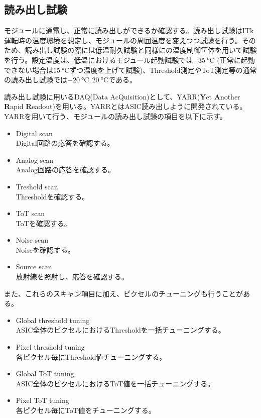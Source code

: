 \subsection{読み出し試験 \cite{electricaldoc}}
\label{sec:electricaltest}
モジュールに通電し、正常に読み出しができるか確認する。読み出し試験はITk運転時の温度環境を想定し、モジュールの周囲温度を変えつつ試験を行う。そのため、読み出し試験の際には低温耐久試験と同様にの温度制御筐体を用いて試験を行う。設定温度は、低温におけるモジュール起動試験では$-35\ \si{\degreeCelsius}$ (正常に起動できない場合は$15\ \si{\degreeCelsius}$ずつ温度を上げて試験)、Threshold測定やToT測定等の通常の読み出し試験では$-20\ \si{\degreeCelsius}, 20\ \si{\degreeCelsius}$である。

読み出し試験に用いるDAQ(Data AcQuisition)として、YARR(\textbf{Y}et \textbf{A}nother \textbf{R}apid \textbf{R}eadout)を用いる。YARRとはASIC読み出しように開発されている。YARRを用いて行う、モジュールの読み出し試験の項目を以下に示す。

\begin{itemize}
  \item Digital scan \\
  Digital回路の応答を確認する。
  \item Analog scan \\
  Analog回路の応答を確認する。
  \item Treshold scan \\
  Thresholdを確認する。
  \item ToT scan \\
  ToTを確認する。
  \item Noise scan \\
  Noiseを確認する。
  \item Source scan \\
  放射線を照射し、応答を確認する。
\end{itemize}

また、これらのスキャン項目に加え、ピクセルのチューニングも行うことがある。
\begin{itemize}
  \item Global threshold tuning \\
  ASIC全体のピクセルにおけるThresholdを一括チューニングする。
  \item Pixel threshold tuning \\
  各ピクセル毎にThreshold値チューニングする。
  \item Global ToT tuning \\
  ASIC全体のピクセルにおけるToT値を一括チューニングする。
  \item Pixel ToT tuning \\
  各ピクセル毎にToT値をチューニングする。
\end{itemize}


